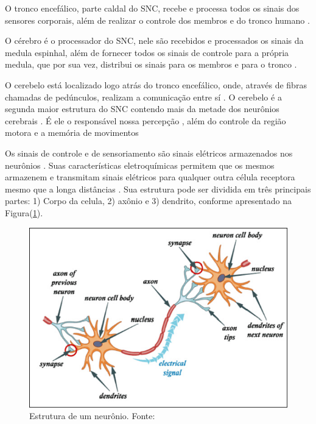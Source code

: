 O tronco encefálico, parte caldal do SNC, recebe e processa todos os sinais dos sensores corporais, além de realizar o controle dos membros e do tronco humano \cite{KANDEL}.

O cérebro é o processador do SNC, nele são recebidos e processados os sinais da medula espinhal, além de fornecer todos os sinais de controle para a própria medula, que por sua vez, distribui os sinais para os membros e para o tronco \cite{KANDEL}.

O cerebelo está localizado logo atrás do tronco encefálico, onde, através de fibras chamadas de pedúnculos, realizam a comunicação entre sí \cite{KANDEL}. O cerebelo é a segunda maior estrutura do SNC contendo mais da metade dos neurônios cerebrais \cite{SIULYDissertacao}. É ele o responsável nossa percepção \cite{alvarezneurobiomecanismos}, além do controle da região motora e a memória de movimentos \cite{SIULYDissertacao,alvarezneurobiomecanismos}

Os sinais de controle e de sensoriamento são sinais elétricos armazenados nos neurônios \cite{KANDEL}. Suas características eletroquímicas permitem que os mesmos armazenem e transmitam sinais elétricos para qualquer outra célula receptora mesmo que a longa distâncias \cite{SIULYDissertacao}. Sua estrutura pode ser dividida em três principais partes: 1) Corpo da celula, 2) axônio e 3) dendrito, conforme apresentado na Figura(\ref{neuronParts}).
\begin{figure}[h]
	\centering
	\includegraphics[keepaspectratio=true,scale=1.0]{figuras/Estrutura_neuronio.PNG}
	\caption{Estrutura de um neurônio. Fonte: \cite{SIULYDissertacao}}
	\label{neuronParts}
\end{figure}

